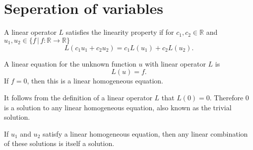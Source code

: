 \documentclass{article}
\begin{document}
\section{Seperation of variables}
\begin{definition}
	A linear operator \(L\) satisfies the linearity property if for \(c_1,c_2\in\mathbb{R}\) and \(u_1,u_2\in\{f\,|\,f:\mathbb{R}\rightarrow\mathbb{R}\}\)
	\begin{equation*}
		L(c_1u_1+c_2u_2)=c_1L(u_1)+c_2L(u_2).
	\end{equation*}
\end{definition}
\begin{definition}
	A linear equation for the unknown function \(u\) with linear operator \(L\) is
	\begin{equation*}
		L(u)=f.
	\end{equation*}
	If \(f=0\), then this is a linear homogeneous equation.
\end{definition}
\begin{proposition}
	It follows from the definition of a linear operator \(L\) that \(L(0)=0\). Therefore \(0\) is a solution to any linear homogeneous equation, also known as the trivial solution.
\end{proposition}
\begin{definition}
	If \(u_1\) and \(u_2\) satisfy a linear homogeneous equation, then any linear combination of these solutions is itself a solution.
\end{definition}
\end{document}
